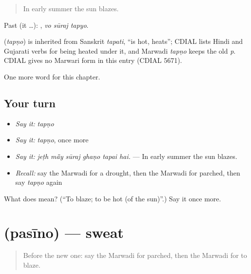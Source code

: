 \begin{quote}
In early summer the sun blazes.
\end{quote}

Past (it …):   , \emph{vo sūraj tapyo}.

\begin{cousinweb}
\textbf{} (\emph{tapṇo}) is inherited from Sanskrit \emph{tapati}, \textquotedblleft{}is hot, heats\textquotedblright{}; CDIAL lists Hindi and Gujarati verbs for being heated under it, and Marwadi \emph{tapṇo} keeps the old \emph{p}. CDIAL gives no Marwari form in this entry (CDIAL 5671).
\end{cousinweb}

\begin{grammarlens}[title={What you've built}]
One more word for this chapter.
\end{grammarlens}

\subsection*{Your turn}
\begin{itemize}
\raggedright
  \item \emph{Say it:} \emph{tapṇo}
  \item \emph{Say it:} \emph{tapṇo}, once more
  \item \emph{Say it:} \emph{jeṭh mā̃y sūraj ghaṇo tapai hai.} — In early summer the sun blazes.
  \item \emph{Recall:} say the Marwadi for a drought, then the Marwadi for parched, then say \emph{tapṇo} again
\end{itemize}

\begin{tcolorbox}[breakable,colback=teal!4,colframe=teal!35!black,title={Before you move on}]
What does  mean? (\textquotedblleft{}To blaze; to be hot (of the sun)\textquotedblright{}.) Say it once more.
\end{tcolorbox}
\section[\texorpdfstring{\mw{पसीनो} (pasīno)}{पसीनो (pasīno)}]{ (pasīno) — sweat}

\label{lesson:MW-C228-pasino}



\begin{quote}
Before the new one: say the Marwadi for parched, then the Marwadi for to blaze.
\end{quote}

